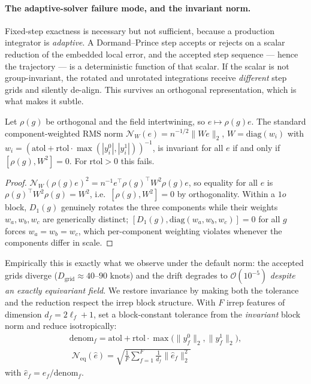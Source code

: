 \paragraph{The adaptive-solver failure mode, and the invariant norm.} Fixed-step exactness is
necessary but not sufficient, because a production integrator is \emph{adaptive}. A Dormand--Prince
step accepts or rejects on a scalar reduction of the embedded local error, and the accepted step
sequence --- hence the trajectory --- is a deterministic function of that scalar. If the scalar is not
group-invariant, the rotated and unrotated integrations receive \emph{different} step grids and
silently de-align. This survives an orthogonal representation, which is what makes it subtle.

\begin{proposition}
\label{prop:fail}
Let $\rho(g)$ be orthogonal and the field intertwining, so $e\mapsto\rho(g)e$. The standard
component-weighted RMS norm $\mathcal{N}_W(e)=n^{-1/2}\|We\|_2$, $W=\mathrm{diag}(w_i)$ with
$w_i=(\mathrm{atol}+\mathrm{rtol}\cdot\max(|y^0_i|,|y^1_i|))^{-1}$, is invariant for all $e$ if and
only if $[\rho(g),W^2]=0$. For $\mathrm{rtol}>0$ this fails.
\end{proposition}
\begin{proof}
$\mathcal{N}_W(\rho(g)e)^2=n^{-1}e^{\!\top}\rho(g)^{\!\top}W^2\rho(g)e$, so equality for all $e$ is
$\rho(g)^{\!\top}W^2\rho(g)=W^2$, i.e.\ $[\rho(g),W^2]=0$ by orthogonality. Within a $1o$ block,
$D_1(g)$ genuinely rotates the three components while their weights $w_a,w_b,w_c$ are generically
distinct; $[D_1(g),\mathrm{diag}(w_a,w_b,w_c)]=0$ for all $g$ forces $w_a=w_b=w_c$, which
per-component weighting violates whenever the components differ in scale.
\end{proof}
%
Empirically this is exactly what we observe under the default norm: the accepted grids diverge
($D_{\text{grid}}\approx40\text{--}90$ knots) and the drift degrades to $\mathcal{O}(10^{-5})$
\emph{despite an exactly equivariant field}. We restore invariance by making both the tolerance and
the reduction respect the irrep block structure. With $F$ irrep features of dimension
$d_f=2\ell_f+1$, set a block-constant tolerance from the \emph{invariant} block norm and reduce
isotropically:
%
\begin{equation}
\label{eq:neq}
\begin{gathered}
\mathrm{denom}_f=\mathrm{atol}+\mathrm{rtol}\cdot\max\big(\|y^0_f\|_2,\|y^1_f\|_2\big),\\[2pt]
\boxed{\;\mathcal{N}_{\text{eq}}(\hat e)=\sqrt{\frac1F\sum_{f=1}^{F}\frac{1}{d_f}\|\hat e_f\|_2^2}\;}
\end{gathered}
\end{equation}
%
with $\hat e_f=e_f/\mathrm{denom}_f$.

